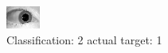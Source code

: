 \begin{figure}[h!]
\begin{center}
\includegraphics[width=0.60\columnwidth]{figures/ID1543_class_2_target_1.png}
\end{center}
\caption{ Classification: 2 actual target: 1}
\label{fig:ID1543_class_2_target_1}
\end{figure}
